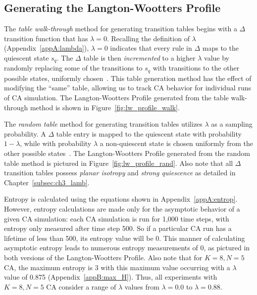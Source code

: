 \documentclass[a4paper,11pt]{report}
\begin{document}
\subsection*{Generating the Langton-Wootters Profile}

The \textit{table walk-through} method for generating transition tables begins with a $\Delta$ transition function that has $\lambda = 0$. Recalling the definition of $\lambda$ (Appendix~\ref{appA:lambda}), $\lambda=0$ indicates that every rule in $\Delta$ maps to the quiescent state $s_q$. The $\Delta$ table is then \textit{incremented} to a higher $\lambda$ value by randomly replacing some of the transitions to $s_q$ with transitions to the other possible states, uniformly chosen~\cite{la90}. This table generation method has the effect of modifying the ``same'' table, allowing us to track CA behavior for individual runs of CA simulation. The Langton-Wootters Profile generated from the table walk-through method is shown in Figure~\ref{fig:lw_profile_walk}.

The \textit{random table} method for generating transition tables utilizes $\lambda$ as a sampling probability. A $\Delta$ table entry is mapped to the quiescent state with probability $1 - \lambda$, while with probability $\lambda$ a non-quiescent state is chosen uniformly from the other possible states~\cite{la90}. The Langton-Wootters Profile generated from the random table method is pictured in Figure~\ref{fig:lw_profile_rand}. Also note that all $\Delta$ transition tables possess \textit{planar isotropy} and \textit{strong quiescence} as detailed in Chapter~\ref{subsec:ch3_lamb}.

Entropy is calculated using the equations shown in Appendix~\ref{appA:entrop}. However, entropy calculations are made only for the asymptotic behavior of a given CA simulation: each CA simulation is run for 1,000 time steps, with entropy only measured after time step 500. So if a particular CA run has a lifetime of less than 500, its entropy value will be 0. This manner of calculating asymptotic entropy leads to numerous entropy measurements of 0, as pictured in both versions of the Langton-Wootters Profile. Also note that for $K=8, N=5$ CA, the maximum entropy is 3 with this maximum value occurring with a $\lambda$ value of 0.875 (Appendix~\ref{appB:max_H}). Thus, all experiments with $K=8, N=5$ CA consider a range of $\lambda$ values from $\lambda = 0.0$ to $\lambda = 0.88$. 
\end{document}
